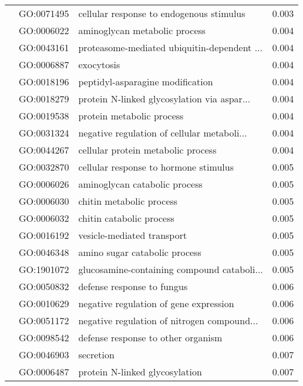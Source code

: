 \begin{longtable}{lllr}
   & GO:0071495 &     cellular response to endogenous stimulus &         0.003 \\
   & GO:0006022 &                aminoglycan metabolic process &         0.004 \\
   & GO:0043161 &  proteasome-mediated ubiquitin-dependent ... &         0.004 \\
   & GO:0006887 &                                   exocytosis &         0.004 \\
   & GO:0018196 &             peptidyl-asparagine modification &         0.004 \\
   & GO:0018279 &  protein N-linked glycosylation via aspar... &         0.004 \\
   & GO:0019538 &                    protein metabolic process &         0.004 \\
   & GO:0031324 &  negative regulation of cellular metaboli... &         0.004 \\
   & GO:0044267 &           cellular protein metabolic process &         0.004 \\
   & GO:0032870 &        cellular response to hormone stimulus &         0.005 \\
   & GO:0006026 &                aminoglycan catabolic process &         0.005 \\
   & GO:0006030 &                     chitin metabolic process &         0.005 \\
   & GO:0006032 &                     chitin catabolic process &         0.005 \\
   & GO:0016192 &                   vesicle-mediated transport &         0.005 \\
   & GO:0046348 &                amino sugar catabolic process &         0.005 \\
   & GO:1901072 &  glucosamine-containing compound cataboli... &         0.005 \\
   & GO:0050832 &                   defense response to fungus &         0.006 \\
   & GO:0010629 &       negative regulation of gene expression &         0.006 \\
   & GO:0051172 &  negative regulation of nitrogen compound... &         0.006 \\
   & GO:0098542 &           defense response to other organism &         0.006 \\
   & GO:0046903 &                                    secretion &         0.007 \\
   & GO:0006487 &               protein N-linked glycosylation &         0.007 \\

\end{longtable}
